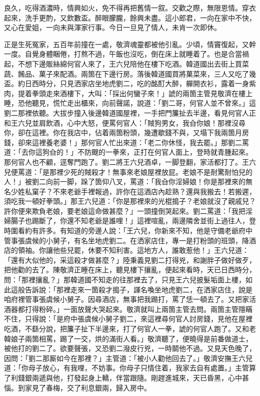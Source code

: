 良久，吃得酒濃時，情興如火，免不得再把舊情一叙。交歡之際，無限恩情。穿衣起來，洗手更酌，又飲數盃。醉眼朦朧，餘興未盡。這小郎君，一向在家中不快，又心在愛姐，一向未與渾家行事。今日一旦見了情人，未肯一次即休。

正是生死冤家，五百年前撞在一處，敬濟魂靈都被他引亂。少頃，情竇復起，又幹一度。自覺身體睏倦，打熬不過，午飯也沒吃，倒在床上就睡着了。也是合當禍起，不想下邊販絲綿何官人來了，王六兒陪他在樓下吃酒。韓道國出去街上買菜蔬、餚品、菓子來配酒。兩箇在下邊行房。落後韓道國買將菓菜來，三人又吃了幾盃。約日西時分，只見洒家店坐地虎劉二，吃的酩酊大醉，軃開衣衫，露着一身紫肉，提着拳頭走來酒樓下，大叫：「採出何蠻子來！」諕的兩箇主管見敬濟在樓上睡，恐他聽見，慌忙走出櫃來，向前聲諾，說道：「劉二哥，何官人並不曾來。」這劉二那裡依聽。大拔步撞入後邊韓道國屋裡，一手把門簾扯去半邊，看見何官人正和王六兒並肩飲酒，心中大怒，便罵何官人：「賊狗男女，我㒲你娘！那裡沒尋你，卻在這裡。你在我店中，佔着兩箇粉頭，幾遭歇錢不與，又塌下我兩箇月房錢，卻來這裡養老婆！」{}那何官人忙出來道：「老二你休怪，我去罷。」那劉二罵道：「去你這狗㒲的！」不防颼的一拳來，正打在何官人面上，登時就青腫起來。那何官人也不顧，逕奪門跑了。劉二將王六兒酒卓，一脚登翻，家活都打了。王六兒便罵道：「是那裡少死的賊殺才！無事來老娘屋裡放屁。老娘不是耐驚耐怕兒的人！」{}被劉二向前一脚，跺了箇仰八叉，罵道：「我㒲你淫婦娘！你是那裡來的無名少姓私窠子？不來老爺手裡報過，許你在這酒店內趁熟？還與我搬去！若搬遲，須吃我一頓好拳頭。」那王六兒道：「你是那裡來的光棍搗子？老娘就沒了親戚兒？許你便來欺負老娘，要老娘這命做甚麼？」一頭撞倒哭起來。劉二罵道：「我把淫婦腸子也踢斷了，你還不知老爺是誰哩！」這裡喧亂，兩邊隣舍並街上過往人，登時圍看約有許多。有知道的旁邊人說：「王六兒，你新來不知，他是守備老爺府中管事張虞候的小舅子，有名坐地虎劉二。在洒家店住，專一是打粉頭的班頭，降酒店的領袖。你讓他些兒罷，休要不知利害。這地方人，誰敢惹他！」王六兒道：「還有大似他的，采這殺才做甚麼？」陸秉義見劉二打得兇，和謝胖子做好做歹，把他勸的去了。陳敬濟正睡在床上，聽見樓下攘亂，便起來看時，天已日西時分，問：「那裡攘亂？」那韓道國不知走的往那裡去了，只見王六兒披髮垢面上樓，如此這般告訴說：「那裡走來一箇殺才搗子，諢名喚坐地虎劉二，在洒家店住，說是咱府裡管事張虞候小舅子。因尋酒店，無事把我踢打，罵了恁一頓去了。又把家活酒器都打得粉碎。」一面放聲大哭起來。敬濟就叫上兩箇主管去問。兩箇主管隱瞞不住，只得說：「是府中張虞候小舅子劉二，來這裡尋何官人討房錢，見他在屋裡吃酒，不繇分說，把簾子扯下半邊來，打了何官人一拳，諕的何官人跑了。又和老韓娘子兩箇相罵，踢了一交，烘的滿街人看。」敬濟聽了，便曉得是前番做道士，被他打的劉二了。欲要聲張，又恐劉二潑皮行兇，一時鬬他不過。又見天色晚了，因問：「劉二那厮如今在那裡？」主管道：「被小人勸他回去了。」敬濟安撫王六兒道：「你母子放心，有我哩，不妨事。你母子只情住着，我家去自有處置。」主管算了利錢銀兩遞與他，打發起身上轎，伴當跟隨。剛趕進城來，天已昏黑，心中甚惱。到家見了春梅，交了利息銀兩，歸入房中。

